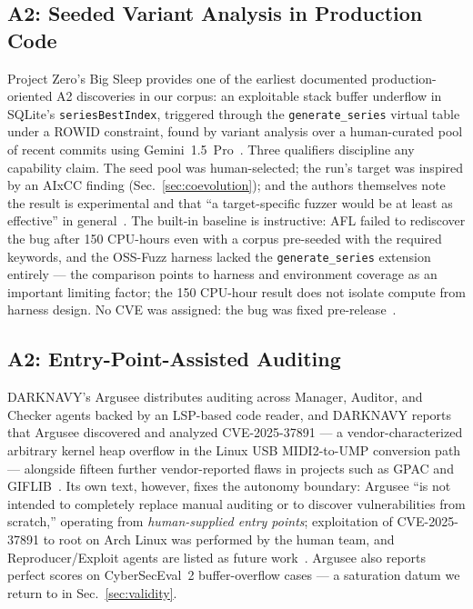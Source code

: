 \documentclass[conference,compsoc]{IEEEtran}
\begin{document}
\subsection{A2: Seeded Variant Analysis in Production Code}
Project Zero's Big Sleep provides one of the earliest documented production-oriented A2 discoveries in our corpus: an
exploitable stack buffer underflow in SQLite's \texttt{seriesBestIndex}, triggered through the
\texttt{generate\_series} virtual table under a ROWID constraint, found by variant analysis over
a human-curated pool of recent commits using Gemini~1.5~Pro~\cite{bigsleep2024}. Three
qualifiers discipline any capability claim. The seed pool was human-selected; the run's target
was inspired by an AIxCC finding (Sec.~\ref{sec:coevolution}); and the authors themselves note
the result is experimental and that ``a target-specific fuzzer would be at least as effective''
in general~\cite{bigsleep2024}. The built-in baseline is instructive: AFL failed to
rediscover the bug after 150 CPU-hours even with a corpus pre-seeded with the required keywords,
and the OSS-Fuzz harness lacked the \texttt{generate\_series} extension entirely
--- the comparison points to harness and environment coverage as an important limiting factor; the 150 CPU-hour result does not isolate compute from harness design.
No CVE was assigned: the bug was fixed pre-release~\cite{bigsleep2024}.

\subsection{A2: Entry-Point-Assisted Auditing}
DARKNAVY's Argusee distributes auditing across Manager, Auditor, and Checker agents backed by an
LSP-based code reader, and DARKNAVY reports that Argusee discovered and analyzed CVE-2025-37891 --- a vendor-characterized arbitrary
kernel heap overflow in the Linux USB MIDI2-to-UMP conversion path --- alongside fifteen further
vendor-reported flaws in projects such as GPAC and GIFLIB~\cite{darknavyargusee2025}. Its own
text, however, fixes the autonomy boundary: Argusee ``is not intended to completely replace
manual auditing or to discover vulnerabilities from scratch,'' operating from
\emph{human-supplied entry points}; exploitation of CVE-2025-37891 to root on Arch Linux was
performed by the human team, and Reproducer/Exploit agents are listed as future
work~\cite{darknavyargusee2025}. Argusee also reports perfect scores on CyberSecEval~2
buffer-overflow cases --- a saturation datum we return to in Sec.~\ref{sec:validity}.
\end{document}
